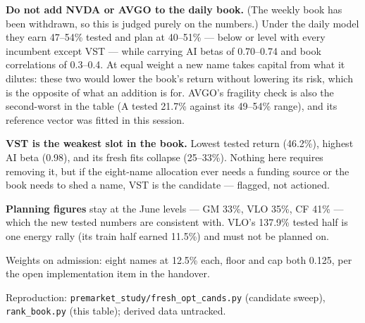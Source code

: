 \documentclass[11pt,a4paper]{article}
\begin{document}
\textbf{Do not add NVDA or AVGO to the daily book.} (The weekly book has been
withdrawn, so this is judged purely on the numbers.) Under the daily model they earn
47--54\% tested and plan at 40--51\% --- below or level with every incumbent except
VST --- while carrying AI betas of 0.70--0.74 and book correlations of 0.3--0.4. At
equal weight a new name takes capital from what it dilutes: these two would lower the
book's return without lowering its risk, which is the opposite of what an addition is
for. AVGO's fragility check is also the second-worst in the table (A tested 21.7\%
against its 49--54\% range), and its reference vector was fitted in this session.

\textbf{VST is the weakest slot in the book.} Lowest tested return (46.2\%), highest
AI beta (0.98), and its fresh fits collapse (25--33\%). Nothing here requires
removing it, but if the eight-name allocation ever needs a funding source or the
book needs to shed a name, VST is the candidate --- flagged, not actioned.

\textbf{Planning figures} stay at the June levels --- GM 33\%, VLO 35\%, CF 41\% ---
which the new tested numbers are consistent with. VLO's 137.9\% tested half is one
energy rally (its train half earned 11.5\%) and must not be planned on.

Weights on admission: eight names at 12.5\% each, floor and cap both 0.125, per the
open implementation item in the handover.

Reproduction: \texttt{premarket\_study/fresh\_opt\_cands.py} (candidate sweep),
\texttt{rank\_book.py} (this table); derived data untracked.
\end{document}
